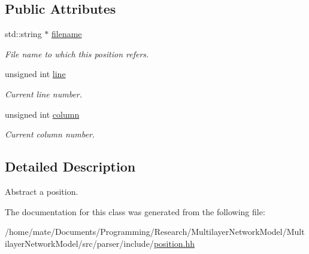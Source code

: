 \subsection*{Public Attributes}
\begin{DoxyCompactItemize}
\item 
std\+::string $\ast$ \hyperlink{classEquationParser_1_1position_ae72228d06f93d658f9e6023f1d0b89c6}{filename}\hypertarget{classEquationParser_1_1position_ae72228d06f93d658f9e6023f1d0b89c6}{}\label{classEquationParser_1_1position_ae72228d06f93d658f9e6023f1d0b89c6}

\begin{DoxyCompactList}\small\item\em File name to which this position refers. \end{DoxyCompactList}\item 
unsigned int \hyperlink{classEquationParser_1_1position_a087471d9fd1ad64feeb4f5f9b7216d0a}{line}\hypertarget{classEquationParser_1_1position_a087471d9fd1ad64feeb4f5f9b7216d0a}{}\label{classEquationParser_1_1position_a087471d9fd1ad64feeb4f5f9b7216d0a}

\begin{DoxyCompactList}\small\item\em Current line number. \end{DoxyCompactList}\item 
unsigned int \hyperlink{classEquationParser_1_1position_a814bc54c59419fb7d2e82bb33b5c9aa8}{column}\hypertarget{classEquationParser_1_1position_a814bc54c59419fb7d2e82bb33b5c9aa8}{}\label{classEquationParser_1_1position_a814bc54c59419fb7d2e82bb33b5c9aa8}

\begin{DoxyCompactList}\small\item\em Current column number. \end{DoxyCompactList}\end{DoxyCompactItemize}


\subsection{Detailed Description}
Abstract a position. 

The documentation for this class was generated from the following file\+:\begin{DoxyCompactItemize}
\item 
/home/mate/\+Documents/\+Programming/\+Research/\+Multilayer\+Network\+Model/\+Multilayer\+Network\+Model/src/parser/include/\hyperlink{position_8hh}{position.\+hh}\end{DoxyCompactItemize}
